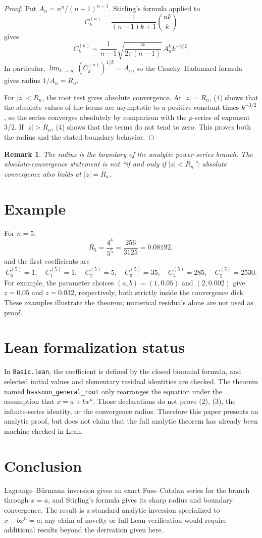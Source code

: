 \documentclass[11pt,a4paper]{article}
\newtheorem{remark}{Remark}
\begin{document}
\begin{proof}
Put $A_n=n^n/(n-1)^{n-1}$. Stirling's formula applied to
\[
C_k^{(n)}
=\frac{1}{(n-1)k+1}\binom{nk}{k}
\]
gives
\[
C_k^{(n)}
\sim
\frac{1}{n-1}\sqrt{\frac{n}{2\pi(n-1)}}\,
A_n^k k^{-3/2}. \tag{4}
\]
In particular, $\lim_{k\to\infty}(C_k^{(n)})^{1/k}=A_n$, so the
Cauchy--Hadamard formula gives radius $1/A_n=R_n$.

For $|z|<R_n$, the root test gives absolute convergence. At
$|z|=R_n$, (4) shows that the absolute values of the terms are
asymptotic to a positive constant times $k^{-3/2}$, so the series
converges absolutely by comparison with the $p$-series of exponent
$3/2$. If $|z|>R_n$, (4) shows that the terms do not tend to zero.
This proves both the radius and the stated boundary behavior.
\end{proof}

\begin{remark}
The radius is the boundary of the analytic power-series branch. The
absolute-convergence statement is not ``if and only if $|z|<R_n$'':
absolute convergence also holds at $|z|=R_n$.
\end{remark}

\section{Example}
For $n=5$,
\[
R_5=\frac{4^4}{5^5}=\frac{256}{3125}=0.08192,
\]
and the first coefficients are
\[
C_0^{(5)}=1,\quad C_1^{(5)}=1,\quad C_2^{(5)}=5,\quad
C_3^{(5)}=35,\quad C_4^{(5)}=285,\quad C_5^{(5)}=2530.
\]
For example, the parameter choices $(a,b)=(1,0.05)$ and $(2,0.002)$
give $z=0.05$ and $z=0.032$, respectively, both strictly inside the
convergence disk. These examples illustrate the theorem; numerical
residuals alone are not used as proof.

\section{Lean formalization status}
In \texttt{Basic.lean}, the coefficient is defined by the closed binomial
formula, and selected initial values and elementary residual identities
are checked. The theorem named \texttt{hassoun\_general\_root} only rearranges
the equation under the assumption that $x=a+bx^n$. Those declarations do
not prove (2), (3), the infinite-series identity, or the convergence
radius. Therefore this paper presents an analytic proof, but does not claim
that the full analytic theorem has already been machine-checked in Lean.

\section{Conclusion}
Lagrange--B\"urmann inversion gives an exact Fuss--Catalan series for the
branch through $x=a$, and Stirling's formula gives its sharp radius and
boundary convergence. The result is a standard analytic inversion
specialized to $x-bx^n=a$; any claim of novelty or full Lean verification
would require additional results beyond the derivation given here.
\end{document}
